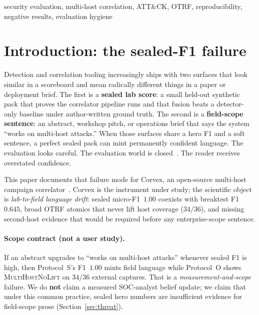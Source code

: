 \documentclass[conference,compsoc]{IEEEtran}
\begin{document}
\begin{IEEEkeywords}
security evaluation, multi-host correlation, ATT\&CK, OTRF,
reproducibility, negative results, evaluation hygiene
\end{IEEEkeywords}

\section{Introduction: the sealed-F1 failure}
\label{sec:intro}

Detection and correlation tooling increasingly ships with two surfaces that
look similar in a scoreboard and mean radically different things in a paper
or deployment brief.
The first is a \textbf{sealed lab score}: a small held-out synthetic pack that
proves the correlator pipeline runs and that fusion beats a detector-only
baseline under author-written ground truth.
The second is a \textbf{field-scope sentence}: an abstract, workshop pitch, or
operations brief that says the system ``works on multi-host attacks.''
When those surfaces share a hero F1 and a soft sentence, a perfect sealed pack
can mint permanently confident language.
The evaluation looks careful.
The evaluation world is closed~\cite{sommer_paxson_2010}.
The reader receives overstated confidence.

This paper documents that failure mode for Corvex, an open-source multi-host
campaign correlator~\cite{corvex_artifact}.
Corvex is the instrument under study; the scientific object is
\emph{lab-to-field language drift}: sealed micro-F1~$1.00$ coexists with
breaktest F1~$0.645$, broad OTRF atomics that never lift host coverage
($34/36$), and missing second-host evidence that would be required before any
enterprise-scope sentence.

\paragraph{Scope contract (not a user study).}
If an abstract upgrades to ``works on multi-host attacks'' whenever sealed F1
is high, then Protocol~S's F1~$1.00$ mints field language while Protocol~O
shows \textsc{MultiHostNoLift} on $34/36$ external captures.
That is a \emph{measurement-and-scope} failure.
We do \textbf{not} claim a measured SOC-analyst belief update; we claim that
under this common practice, sealed hero numbers are insufficient evidence for
field-scope prose (Section~\ref{sec:threat}).
\end{document}
